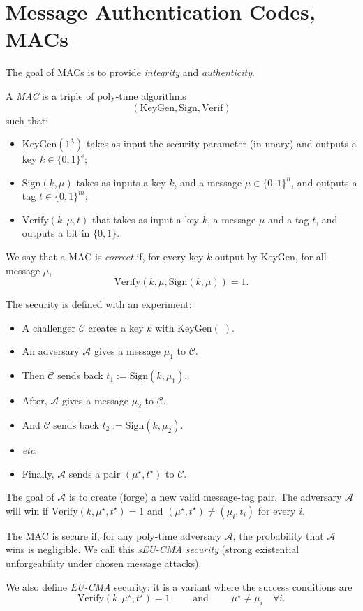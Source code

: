 \documentclass[./main]{subfiles}
\begin{document}
  \chapter{Message Authentication Codes, MACs}

  The goal of MACs is to provide \textit{integrity} and \textit{authenticity}.

  \begin{defn}
    A \textit{MAC} is a triple of poly-time algorithms
    \[
      (\mathrm{KeyGen}, \mathrm{Sign}, \mathrm{Verif})
    \]
    such that:
    \begin{itemize}
      \item $\mathrm{KeyGen}(1^\lambda)$ takes as input the security parameter (in unary) and outputs a key $k \in \{0,1\}^s$;
      \item $\mathrm{Sign}(k, \mu)$ takes as inputs a key $k$, and a message $\mu \in \{0,1\}^n$, and outputs a tag $t \in \{0,1\}^m$;
      \item $\mathrm{Verify}(k, \mu, t)$ that takes as input a key $k$, a message $\mu$ and a tag $t$, and outputs a bit in $\{0,1\}$.
    \end{itemize}

    We say that a MAC is \textit{correct} if, for every key $k$ output by $\mathrm{KeyGen}$, for all message $\mu$, 
    \[
    \mathrm{Verify}(k, \mu, \mathrm{Sign}(k, \mu)) = 1
    .\]

    The security is defined with an experiment:
    \begin{itemize}
      \item A challenger $\mathcal{C}$ creates a key $k$ with $\mathrm{KeyGen}(\;)$.
      \item An adversary $\mathcal{A}$ gives a message $\mu_1$ to $\mathcal{C}$.
      \item Then $\mathcal{C}$ sends back $t_1 := \mathrm{Sign}(k, \mu_1)$.
      \item After, $\mathcal{A}$ gives a message $\mu_2$ to $\mathcal{C}$.
      \item And $\mathcal{C}$ sends back $t_2 := \mathrm{Sign}(k, \mu_2)$.
      \item \textit{etc}.
      \item Finally, $\mathcal{A}$ sends a pair $(\mu^\star, t^\star)$ to  $\mathcal{C}$.
    \end{itemize}
    The goal of $\mathcal{A}$ is to create (forge) a new valid message-tag pair.
    The adversary $\mathcal{A}$ will win if $\mathrm{Verify}(k, \mu^\star, t^\star) = 1$ and $(\mu^\star, t^\star) \neq (\mu_i, t_i)$ for every $i$.

    The MAC is secure if, for any poly-time adversary $\mathcal{A}$, the probability that $\mathcal{A}$ wins is negligible.
    We call this \textit{sEU-CMA security} (strong existential unforgeability under chosen message attacks).

    We also define \textit{EU-CMA} security: it is a variant where the success conditions are 
    \[
    \mathrm{Verify}(k, \mu^\star, t^\star) = 1 \quad\quad \text{ and } \quad\quad \mu^\star \neq \mu_i \quad \forall i
    .\] 
  \end{defn}
\end{document}

